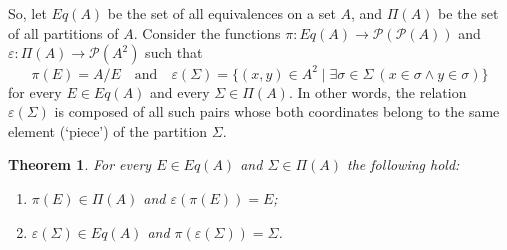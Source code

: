 \documentclass[12pt,notitlepage]{article}
\theoremstyle{plain}
\newtheorem{thm}{Theorem}[section]
\theoremstyle{definition}
\theoremstyle{plain}
\newcommand{\sbs}{\subseteq}
\newcommand{\void}{\varnothing}
\newcommand{\mP}{\mathcal{P}}
\newcommand{\eps}{\varepsilon}
\newcommand{\1}{\mathbf{1}}
\newcommand{\0}{\mathbf{0}}
\begin{document}
So, let $Eq(A)$ be the set of all equivalences on a set $A$, and $\Pi(A)$ be the set of all partitions of $A$. Consider the functions $\pi\colon Eq(A) \to \mP (\mP(A))$ and $\eps\colon \Pi(A) \to \mP(A^2)$ such that
$$\pi(E) = A / E \quad\mbox{and}\quad \eps(\Sigma) = \{(x,y) \in A^2 \mid \exists \sigma \in \Sigma\: (x \in \sigma \wedge y \in \sigma)\}$$
for every $E \in Eq(A)$ and every $\Sigma \in \Pi(A)$. In other words, the relation $\eps(\Sigma)$ is composed of all such pairs whose both coordinates belong to the same element (`piece') of the partition $\Sigma$.
\begin{thm}
For every $E \in Eq(A)$ and $\Sigma \in \Pi(A)$ the following hold:
\begin{enumerate}
\item $\pi(E) \in \Pi(A)$ and $\eps(\pi(E)) = E$;
\item $\eps(\Sigma) \in Eq(A)$ and $\pi(\eps(\Sigma)) = \Sigma$.
\end{enumerate}
\end{thm}
%
%
%
%
\end{document}
